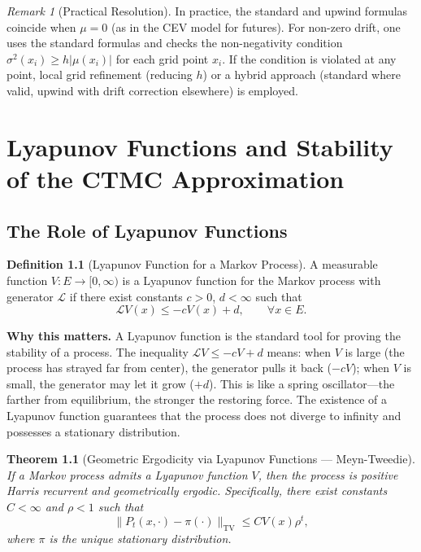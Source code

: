 \documentclass[11pt,a4paper,openany]{book}
\theoremstyle{definition}
\newtheorem{definition}{Definition}[chapter]
\theoremstyle{plain}
\newtheorem{theorem}{Theorem}[chapter]
\theoremstyle{remark}
\newtheorem{remark}[theorem]{Remark}
\newcommand{\1}{\mathbbm{1}}
\newcommand{\calL}{\mathcal{L}}
\begin{document}
\begin{remark}[Practical Resolution]
In practice, the standard and upwind formulas coincide when $\mu = 0$ (as in the CEV model for futures). For non-zero drift, one uses the standard formulas and checks the non-negativity condition $\sigma^{2}(x_{i}) \geq h|\mu(x_{i})|$ for each grid point $x_{i}$. If the condition is violated at any point, local grid refinement (reducing $h$) or a hybrid approach (standard where valid, upwind with drift correction elsewhere) is employed.
\end{remark}

\chapter{Lyapunov Functions and Stability of the CTMC Approximation}
\label{app:lyapunov}

\section{The Role of Lyapunov Functions}

\begin{definition}[Lyapunov Function for a Markov Process]
A measurable function $V: E \to [0, \infty)$ is a Lyapunov function for the Markov process with generator $\calL$ if there exist constants $c > 0$, $d < \infty$ such that
\[
\calL V(x) \leq -c V(x) + d, \qquad \forall x \in E.
\]
\end{definition}

\medskip
\noindent\textbf{Why this matters.} A Lyapunov function is the standard tool for proving the stability of a process. The inequality $\mathcal{L}V \leq -cV + d$ means: when $V$ is large (the process has strayed far from center), the generator pulls it back ($-cV$); when $V$ is small, the generator may let it grow ($+d$). This is like a spring oscillator---the farther from equilibrium, the stronger the restoring force. The existence of a Lyapunov function guarantees that the process does not diverge to infinity and possesses a stationary distribution.

\begin{theorem}[Geometric Ergodicity via Lyapunov Functions --- Meyn-Tweedie]
If a Markov process admits a Lyapunov function $V$, then the process is positive Harris recurrent and geometrically ergodic. Specifically, there exist constants $C < \infty$ and $\rho < 1$ such that
\[
\|P_{t}(x, \cdot) - \pi(\cdot)\|_{\text{TV}} \leq C V(x) \rho^{t},
\]
where $\pi$ is the unique stationary distribution.
\end{theorem}
\end{document}
